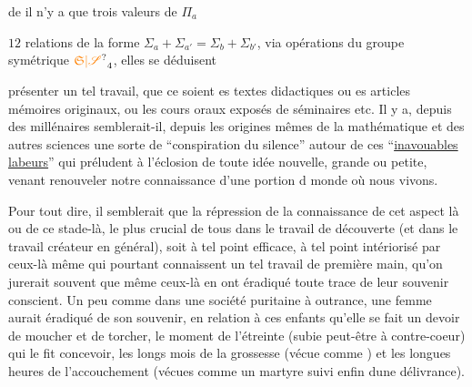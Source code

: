 de  il n'y a que trois valeurs de $\Pi_a$


$12$ relations de la forme $\Sigma_a+\Sigma_{a'}=\Sigma_b+\Sigma_{b'}$,  via opérations du groupe symétrique $\unsure{\mathfrak S|\mathscr S}_4$, elles se déduisent 

présenter un tel travail, que ce soient es  textes didactiques\handwritten{,}  ou es articles  mémoires\deleted{\unsure{,}}  originaux, ou les  cours oraux  exposés de séminaires etc. Il y a, depuis des millénaires semblerait-il, depuis les origines mêmes de la mathématique et des autres sciences\handwritten{,}  une sorte de ``conspiration du silence'' autour de ces  ``\uline{inavouables} \uline{labeurs}'' qui préludent à l'éclosion de toute idée nouvelle, grande ou petite, venant renouveler notre connaissance d'une portion d  monde où nous vivons.

Pour tout dire, il semblerait que la répression de la connaissance de cet aspect là\deleted{\unsure{,}}  ou de ce stade-là, le plus crucial de tous\deleted{\unsure{,}} dans le travail de découverte (et dans le travail créateur en général), soit à tel point efficace, à tel point intériorisé par ceux-là même qui pourtant connaissent un tel travail de première main, qu'on jurerait souvent que même ceux-là  en ont éradiqué toute trace de leur souvenir conscient. Un peu comme dans une société puritaine à outrance, une femme aurait éradiqué de son souvenir,  en relation à  ces enfants qu'elle se fait un devoir de moucher et de torcher, le moment de l'étreinte (subie peut-être à contre-coeur) qui le fit concevoir, les longs mois de la grossesse\deleted{\unsure{,}} (vécue comme  ) et les longues heures de l'accouchement (vécues comme un  martyre\handwritten{,} suivi enfin dune délivrance).

